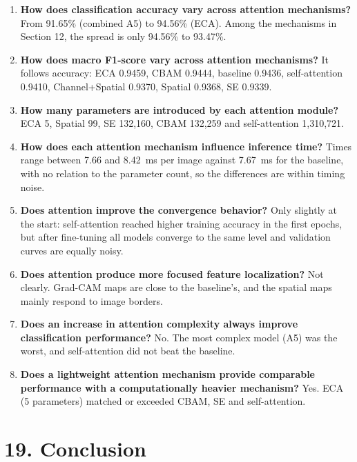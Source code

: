 \documentclass[10pt]{article}
\begin{document}
\begin{enumerate}
\item \textbf{How does classification accuracy vary across attention mechanisms?}
From 91.65\% (combined A5) to 94.56\% (ECA). Among the mechanisms in
Section 12, the spread is only 94.56\% to 93.47\%.

\item \textbf{How does macro F1-score vary across attention mechanisms?}
It follows accuracy: ECA 0.9459, CBAM 0.9444, baseline 0.9436,
self-attention 0.9410, Channel+Spatial 0.9370, Spatial 0.9368, SE 0.9339.

\item \textbf{How many parameters are introduced by each attention module?}
ECA 5, Spatial 99, SE 132{,}160, CBAM 132{,}259 and self-attention
1{,}310{,}721.

\item \textbf{How does each attention mechanism influence inference time?}
Times range between 7.66 and 8.42~ms per image against 7.67~ms for the
baseline, with no relation to the parameter count, so the differences are
within timing noise.

\item \textbf{Does attention improve the convergence behavior?}
Only slightly at the start: self-attention reached higher training accuracy
in the first epochs, but after fine-tuning all models converge to the same
level and validation curves are equally noisy.

\item \textbf{Does attention produce more focused feature localization?}
Not clearly. Grad-CAM maps are close to the baseline's, and the spatial
maps mainly respond to image borders.

\item \textbf{Does an increase in attention complexity always improve classification performance?}
No. The most complex model (A5) was the worst, and self-attention did not
beat the baseline.

\item \textbf{Does a lightweight attention mechanism provide comparable performance with a computationally heavier mechanism?}
Yes. ECA (5 parameters) matched or exceeded CBAM, SE and self-attention.
\end{enumerate}

\section*{19. Conclusion}
\end{document}
